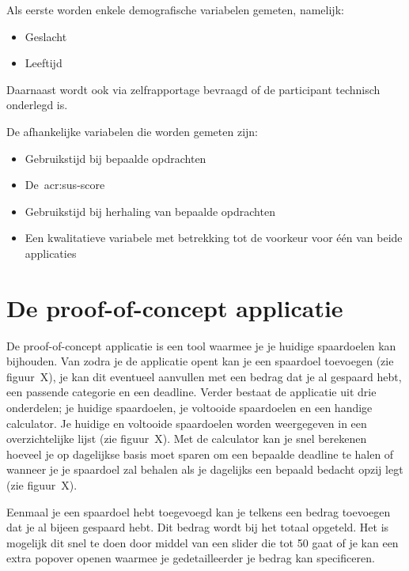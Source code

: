Als eerste worden enkele demografische variabelen gemeten, namelijk:
\begin{itemize}
    \item Geslacht
    \item Leeftijd
\end{itemize}
Daarnaast wordt ook via zelfrapportage bevraagd of de participant technisch onderlegd is.

De afhankelijke variabelen die worden gemeten zijn:
\begin{itemize}
    \item Gebruikstijd bij bepaalde opdrachten
    \item De~\acrshort{acr:sus}-score
    \item Gebruikstijd bij herhaling van bepaalde opdrachten
    \item Een kwalitatieve variabele met betrekking tot de voorkeur voor één van beide applicaties
\end{itemize}

\section{De proof-of-concept applicatie}
\label{sec:applicatie}

De proof-of-concept applicatie is een tool waarmee je je huidige spaardoelen kan bijhouden. Van zodra je de applicatie opent kan je een spaardoel toevoegen (zie figuur~X), je kan dit eventueel aanvullen met een bedrag dat je al gespaard hebt, een passende categorie en een deadline. Verder bestaat de applicatie uit drie onderdelen; je huidige spaardoelen, je voltooide spaardoelen en een handige calculator. Je huidige en voltooide spaardoelen worden weergegeven in een overzichtelijke lijst (zie figuur~X). Met de calculator kan je snel berekenen hoeveel je op dagelijkse basis moet sparen om een bepaalde deadline te halen of wanneer je je spaardoel zal behalen als je dagelijks een bepaald bedacht opzij legt (zie figuur~X).




Eenmaal je een spaardoel hebt toegevoegd kan je telkens een bedrag toevoegen dat je al bijeen gespaard hebt. Dit bedrag wordt bij het totaal opgeteld. Het is mogelijk dit snel te doen door middel van een slider die tot 50 gaat of je kan een extra popover openen waarmee je gedetailleerder je bedrag kan specificeren.

